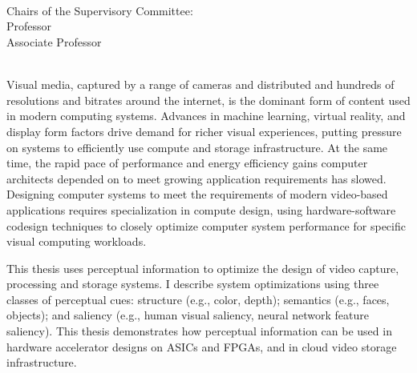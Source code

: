 
\begingroup
\begin{fullwidth}

\let\clearpage\relax
\let\cleardoublepage\relax
\let\cleardoublepage\relax

\thispagestyle{empty}
\begin{center}
     \\
    \bigskip
    {\color{CTtitle}\allcaps{\myTitle} \\ \bigskip
    }
    \bigskip
    \myName \\
    \bigskip
    Chairs of the Supervisory Committee: \\
    Professor \myChair \\
    Associate Professor \myOtherChair \\
    \myDepartment \\
    \bigskip
\end{center}


Visual media, captured by a range of cameras and distributed and hundreds of resolutions and bitrates around the internet, is the dominant form of content used in modern computing systems.
Advances in machine learning, virtual reality, and display form factors drive demand for richer visual experiences, putting pressure on systems to efficiently use compute and storage infrastructure.
At the same time, the rapid pace of performance and energy efficiency gains computer architects depended on to meet growing application requirements has slowed.
Designing computer systems to meet the requirements of modern video-based applications requires specialization in compute design, using hardware-software codesign techniques to closely optimize computer system performance for specific visual computing workloads.

This thesis uses perceptual information to optimize the design of video capture, processing and storage systems.
I describe system optimizations using three classes of perceptual cues: structure (e.g., color, depth); semantics (e.g., faces, objects); and saliency (e.g., human visual saliency, neural network feature saliency).
This thesis demonstrates how perceptual information can be used in hardware accelerator designs on ASICs and FPGAs, and in cloud video storage infrastructure.

\end{fullwidth}
\endgroup
\vfill

